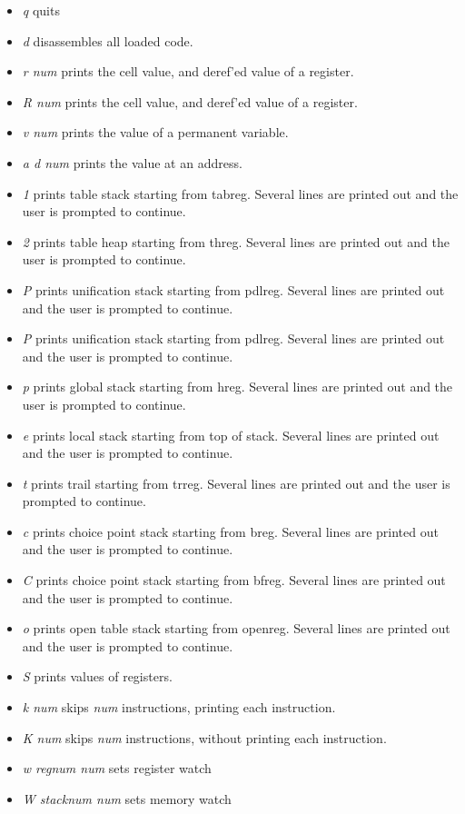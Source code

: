 \documentclass[11pt]{article}
\begin{document}
\begin{itemize}
	\item {\em q} quits 	
\item {\em d} disassembles all loaded
code.  	
\item {\em r num} prints the cell value, and deref'ed value of
a register.  	
\item {\em R num} prints the cell value, and deref'ed
value of a register.  	
\item {\em v num} prints the value of a
permanent variable.  	
\item {\em a d num} prints the value at an
address.  	
\item {\em 1} prints table stack starting from tabreg.
Several lines are printed out and the user is prompted to continue.
\item {\em 2} prints table heap starting from threg.  Several lines
are printed out and the user is prompted to continue.  
\item {\em P}
prints unification stack starting from pdlreg.  Several lines are
printed out and the user is prompted to continue.  	
\item {\em P}
prints unification stack starting from pdlreg.  Several lines are
printed out and the user is prompted to continue.  	
\item {\em p}
prints global stack starting from hreg.  Several lines are printed out
and the user is prompted to continue.  	
\item {\em e} prints local
stack starting from top of stack.  Several lines are printed out and
the user is prompted to continue.  	
\item {\em t} prints trail
starting from trreg.  Several lines are printed out and the user is
prompted to continue.  	
\item {\em c} prints choice point stack
starting from breg.  Several lines are printed out and the user is
prompted to continue.  
\item {\em C} prints choice point stack
starting from bfreg.  Several lines are printed out and the user is
prompted to continue.  	
\item {\em o} prints open table stack starting
from openreg.  Several lines are printed out and the user is prompted
to continue.  	
\item {\em S} prints values of registers.  	
\item {\em k num} skips {\em num} instructions, printing each instruction.
\item {\em K num} skips {\em num} instructions, without printing each
instruction. 
\item {\em w regnum num} sets register watch
\item {\em W stacknum num} sets memory watch
\end{itemize}
\end{document}
